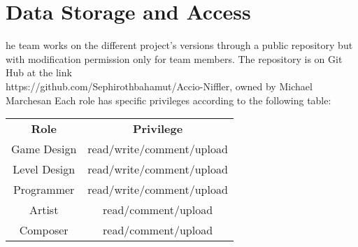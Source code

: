 \section{Data Storage and Access}
he team works on the different project's versions through a public repository but with modification permission only for team members. The repository is on Git Hub at the link\\ https://github.com/Sephirothbahamut/Accio-Niffler, owned by Michael Marchesan
Each role has specific privileges according to the following table: \\

\begin{tabular} {cc}
 \textbf{Role} & \textbf{Privilege}\\
Game Design & read/write/comment/upload \\
Level Design & read/write/comment/upload \\
Programmer & read/write/comment/upload \\
Artist & read/comment/upload \\
Composer & read/comment/upload \\
\end{tabular}

\pagebreak